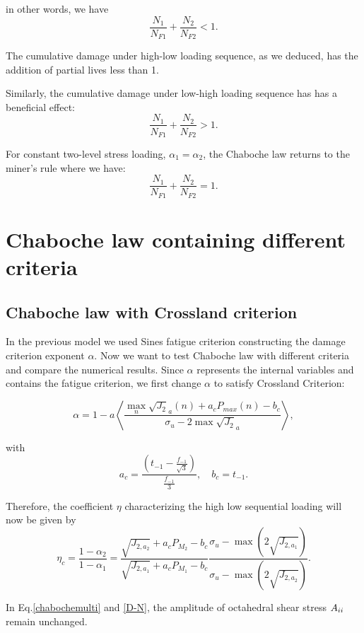 in other words, we have 
$$\frac{N_1}{N_{F1}}+\frac{N_2}{N_{F2}}<1.$$

The cumulative damage under high-low loading sequence, as we deduced, has the addition of partial lives less than 1. 

Similarly, the cumulative damage under low-high loading sequence has has a beneficial effect: 
$$\frac{N_1}{N_{F1}}+\frac{N_2}{N_{F2}}>1.$$

For constant two-level stress loading, $\alpha_1=\alpha_2$, the Chaboche law returns to the miner's rule where we have:
$$\frac{N_1}{N_{F1}}+\frac{N_2}{N_{F2}}=1.$$
\section{Chaboche law containing different criteria}
\subsection{Chaboche law with Crossland criterion}

In the previous model we used Sines fatigue criterion constructing the damage criterion exponent $\alpha$. Now we want to test Chaboche law with different criteria and compare the numerical results. Since $\alpha$ represents the internal variables and contains the fatigue criterion, we first change $\alpha$ to satisfy Crossland Criterion:

\begin{equation}\alpha = 1 - a\left\langle \frac{\max\limits_{n}\sqrt{J_2}_a(n)+a_c{P_{max}(n)}-b_c}{ \sigma_{u} - 2\max\sqrt{J_2}_a}\right\rangle,\end{equation}

with
\begin{equation}
a_c=\frac{(t_{-1}-\frac{f_{-1}}{\sqrt{3}})}{\frac{f_{-1}}{3}}, \quad 
b_c=t_{-1}.
\end{equation}

Therefore, the coefficient $\eta$ characterizing the high low sequential loading will now be given by
\begin{equation}\eta_c=\frac{1-\alpha_2}{1-\alpha_1}=
\frac{\sqrt{J_{2,a_2}}+a_cP_{M_2}-b_c}{\sqrt{J_{2,a_1}}+a_cP_{M_1}-b_c}\frac{ \sigma_{u} - \max(2\sqrt{J_{2,a_1}})}{  \sigma_{u} - \max(2\sqrt{J_{2,a_2}})}.
\end{equation}

In Eq.\eqref{chabochemulti} and \eqref{D-N}, the amplitude of octahedral shear stress $A_{\uppercase\expandafter{\romannumeral2}}$ remain unchanged.

